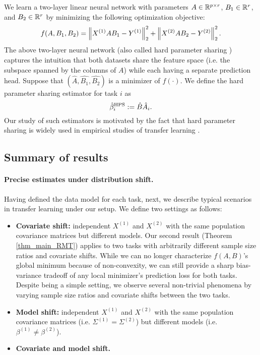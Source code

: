We learn a two-layer linear neural network with parameters $A \in \mathbb{R}^{p\times r}$, $B_1 \in \mathbb{R}^{r}$, and $B_2 \in \mathbb{R}^r$ by minimizing the following optimization objective:
\begin{align}\label{eq_hps}
    f(A, B_1, B_2) = \bignorm{X^{(1)} A B_1 - Y^{(1)}}_2^2 + \bignorm{X^{(2)} A B_2 - Y^{(2)}}_2^2.
\end{align}
The above two-layer neural network (also called hard parameter sharing \cite{C97}) captures the intuition that both datasets share the feature space (i.e. the subspace spanned by the columns of $A$) while each having a separate prediction head.
Suppose that $(\hat{A}, \hat{B_1}, \hat{B_2})$ is a minimizer of $f(\cdot)$.
We define the hard parameter sharing estimator for task $i$ as
\[ \hat{\beta}_i^{\textup{HPS}} := \hat{B} \hat{A}_i. \]
Our study of such estimators is motivated by the fact that hard parameter sharing is widely used in empirical studies of transfer learning \cite{R17}.



\subsection{Summary of results}

\paragraph{Precise estimates under distribution shift.}
Having defined the data model for each task, next, we describe typical scenarios in transfer learning under our setup.
We define two settings as follows:
\begin{itemize}
    \item \textbf{Covariate shift:}
    independent $X^{(1)}$ and $X^{(2)}$ with the same population covariance matrices but different models.
    Our second result (Theorem \ref{thm_main_RMT}) applies to two tasks with arbitrarily different sample size ratios and covariate shifts.
    While we can no longer characterize $f(A, B)$'s global minimum because of non-convexity, we can still provide a sharp bias-variance tradeoff of any local minimizer's prediction loss for both tasks.
    Despite being a simple setting, we observe several non-trivial phenomena by varying sample size ratios and covariate shifts between the two tasks.
    \item \textbf{Model shift:} independent $X^{(1)}$ and $X^{(2)}$ with the same population covariance matrices (i.e. $\Sigma^{(1)}=\Sigma^{(2)}$) but different models (i.e. $\beta^{(1)} \neq \beta^{(2)}$).
    \item \textbf{Covariate and model shift.}
\end{itemize}

